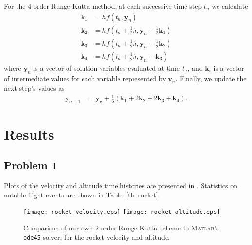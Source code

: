 \documentclass[12pt]{article}
\begin{document}
For the 4\th-order Runge-Kutta method, at each successive time step $t_n$ we calculate
\begin{equation}
\begin{aligned}
\mathbf{k}_1 &= h f(t_n, \mathbf{y}_n)
\\
\mathbf{k}_2 &= h f(t_n + \tfrac{1}{2} h, \mathbf{y}_n + \tfrac{1}{2} \mathbf{k}_1)
\\
\mathbf{k}_3 &= h f(t_n + \tfrac{1}{2} h, \mathbf{y}_n + \tfrac{1}{2} \mathbf{k}_2)
\\
\mathbf{k}_4 &= h f(t_n + \tfrac{1}{2} h, \mathbf{y}_n + \mathbf{k}_3)
\end{aligned}
\end{equation}
where $\mathbf{y}_n$ is a vector of solution variables evaluated at time $t_n$, and $\mathbf{k}_i$ is a vector of intermediate values for each variable represented by $\mathbf{y}_n$. Finally, we update the next step's values as
\begin{equation}
\begin{aligned}
\mathbf{y}_{n+1} &= \mathbf{y}_n + \tfrac{1}{6} \left( \mathbf{k}_1 + 2 \mathbf{k}_2 + 2 \mathbf{k}_3 + \mathbf{k}_4 \right)
.
\end{aligned}
\end{equation}

\section{Results} %

\subsection{Problem 1}

Plots of the velocity and altitude time histories are presented in . Statistics on notable flight events are shown in Table~\ref{tbl:rocket}.

\begin{figure}[h!]
\begin{center}
\texttt{[image: rocket\_velocity.eps]}
\texttt{[image: rocket\_altitude.eps]}
\\[6pt]
\caption{Comparison of our own 2\nd-order Runge-Kutta scheme to \textsc{Matlab}'s \lstinline|ode45| solver, for the rocket velocity and altitude.}
\label{fig:rocket_plots}
\end{center}
\end{figure}
\end{document}
